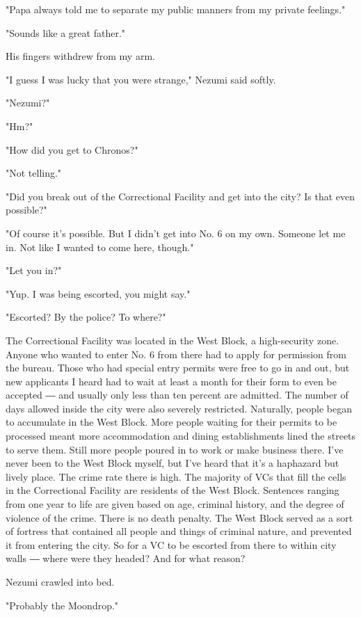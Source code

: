 "Papa always told me to separate my public manners from my private
feelings."

"Sounds like a great father."

His fingers withdrew from my arm.

"I guess I was lucky that you were strange," Nezumi said softly.

"Nezumi?"

"Hm?"

"How did you get to Chronos?"

"Not telling."

"Did you break out of the Correctional Facility and get into the city?
Is that even possible?"

"Of course it's possible. But I didn't get into No. 6 on my own. Someone
let me in. Not like I wanted to come here, though."

"Let you in?"

"Yup. I was being escorted, you might say."

"Escorted? By the police? To where?"

The Correctional Facility was located in the West Block, a high-security
zone. Anyone who wanted to enter No. 6 from there had to apply for
permission from the bureau. Those who had special entry permits were
free to go in and out, but new applicants I heard had to wait at least a
month for their form to even be accepted ― and usually only less than
ten percent are admitted. The number of days allowed inside the city
were also severely restricted. Naturally, people began to accumulate in
the West Block. More people waiting for their permits to be processed
meant more accommodation and dining establishments lined the streets to
serve them. Still more people poured in to work or make business there.
I've never been to the West Block myself, but I've heard that it's a
haphazard but lively place. The crime rate there is high. The majority
of VCs that fill the cells in the Correctional Facility are residents of
the West Block. Sentences ranging from one year to life are given based
on age, criminal history, and the degree of violence of the crime. There
is no death penalty. The West Block served as a sort of fortress that
contained all people and things of criminal nature, and prevented it
from entering the city. So for a VC to be escorted from there to within
city walls ― where were they headed? And for what reason?

Nezumi crawled into bed.

"Probably the Moondrop."

